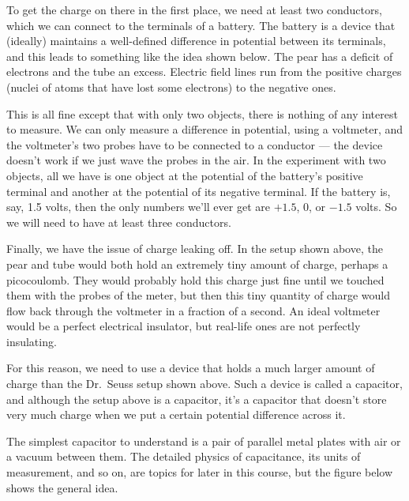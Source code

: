 
To get the charge on there in the first place, we need at least two
conductors, which we can connect to the terminals of a battery.
The battery is a device that (ideally) maintains a well-defined
difference in potential between its terminals, and this leads to
something like the idea shown below. The pear has a deficit of
electrons and the tube an excess. Electric field lines run from
the positive charges (nuclei of atoms that have lost some electrons)
to the negative ones.


This is all fine except that with only two objects, there is nothing
of any interest to measure. We can only measure a difference in potential,
using a voltmeter, and the voltmeter's two probes have to be connected
to a conductor --- the device doesn't work if we just wave the probes
in the air. In the experiment with two objects,
all we have is one object at the potential of
the battery's positive terminal and another at the potential of its
negative terminal. If the battery is, say, 1.5 volts, then the only
numbers we'll ever get are $+1.5$, 0, or $-1.5$ volts. So we will
need to have at least three conductors.

Finally, we have the issue of charge leaking off. In the setup shown
above, the pear and tube would both hold an extremely tiny amount of
charge, perhaps a picocoulomb. They would probably hold this charge just fine until
we touched them with the probes of the meter, but then this tiny quantity of charge would
flow back through the voltmeter in a fraction of a second. An ideal
voltmeter would be a perfect electrical insulator, but real-life ones
are not perfectly insulating.

For this reason, we need to use a device that holds a much larger amount
of charge than the Dr.~Seuss setup shown above. Such a device is called
a capacitor, and although the setup above is a capacitor, it's a capacitor
that doesn't store very much charge when we put a certain potential difference
across it.

The simplest capacitor to understand is a pair of parallel
metal plates with air or a vacuum between them. The detailed
physics of capacitance, its units of measurement, and so on, are topics
for later in this course, but the figure below shows the general idea.

\label{fig:em-fie-covid-capacitor-params}


